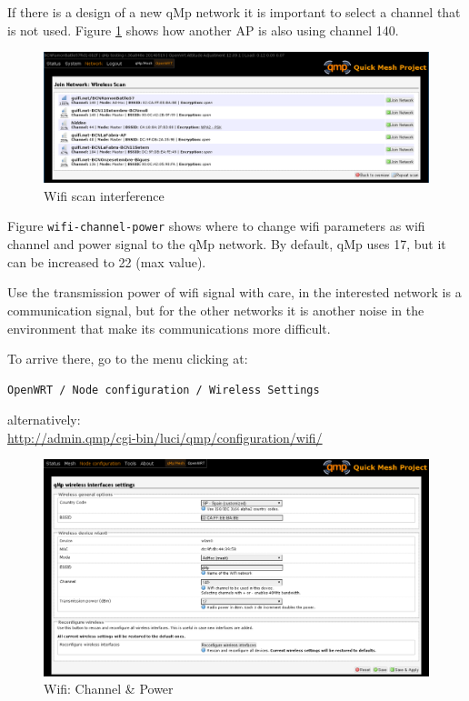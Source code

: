 \documentclass[11pt]{article}
\begin{document}
If there is a design of a new qMp network it is important to select a
channel that is not used. Figure \ref{fig:interference} shows how another AP
is also using channel 140.

\begin{figure}[htb]
\centering
\includegraphics[width=.9\linewidth]{./img/qMp-basics-scrot/wifi_scan_interference.png}
\caption{\label{fig:interference}Wifi scan interference}
\end{figure}

Figure \texttt{wifi-channel-power} shows where to change wifi parameters as
wifi channel and power signal to the qMp network. By default, qMp uses
17, but it can be increased to 22 (max value).

Use the transmission power of wifi signal with care, in the interested
network is a communication signal, but for the other networks it is
another noise in the environment that make its communications more
difficult.

\noindent
To arrive there, go to the menu clicking at:
\begin{verbatim}
OpenWRT / Node configuration / Wireless Settings
\end{verbatim}
alternatively:\\
\url{http://admin.qmp/cgi-bin/luci/qmp/configuration/wifi/}

\begin{figure}[htb]
\centering
\includegraphics[width=.9\linewidth]{./img/qMp-basics-scrot/wifi-channel-power.png}
\caption{\label{fig:wifi-channel-power}Wifi: Channel \& Power}
\end{figure}
\end{document}
